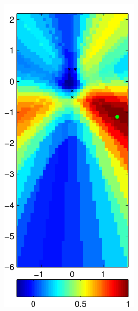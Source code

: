 \documentclass[spanish,openright]{book}
\begin{document}
\begin{figure}
\begin{subfigure}[t]{0.47\textwidth}
\begin{minipage}[t]{\textwidth}
\begin{subfigure}[t]{0.3\textwidth}
\label{fig:Pattern_Fo1500_pos01}
      \end{subfigure}
\begin{subfigure}[t]{0.3\textwidth}
        \includegraphics[width=\textwidth]{SRP_Fo1500_frame003_pos01}

\end{subfigure}
\end{minipage}
\end{subfigure}
\end{figure}
\end{document}
